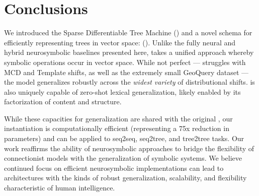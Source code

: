 \section{Conclusions} \label{sec:sdtm-conclusion}
We introduced the Sparse Differentiable Tree Machine (\sdtm) and a novel schema for efficiently representing trees in vector space: \fullrepname (\abvrepname).
Unlike the fully neural and hybrid neurosymbolic baselines presented here, \sdtm takes a unified approach whereby symbolic operations occur in vector space. While not perfect --- \sdtm struggles with MCD and Template shifts, as well as the extremely small GeoQuery dataset --- the model generalizes robustly across the \textit{widest variety} of distributional shifts. \sdtm is also uniquely capable of zero-shot lexical generalization, likely enabled by its factorization of content and structure.

While these capacities for generalization are shared with the original \dtm, our instantiation is computationally efficient (representing a 75x reduction in parameters) and can be applied to seq2seq, seq2tree, and tree2tree tasks. Our work reaffirms the ability of neurosymbolic approaches to bridge the flexibility of connectionist models with the generalization of symbolic systems. We believe continued focus on efficient neurosymbolic implementations can lead to architectures with the kinds of robust generalization, scalability, and flexibility characteristic of human intelligence.
